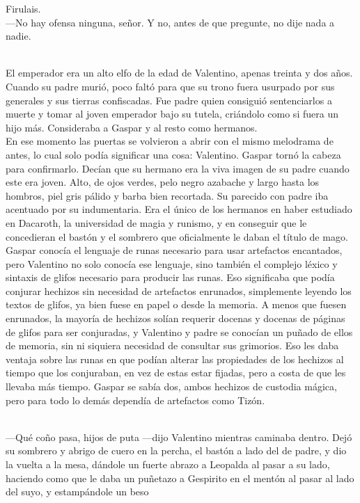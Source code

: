 \documentclass[
  letterpaper,
]{krantz}
\begin{document}
Firulais.\\
---No hay ofensa ninguna, señor. Y no, antes de que pregunte, no dije
nada a nadie.\\
\strut \\
El emperador era un alto elfo de la edad de Valentino, apenas treinta y
dos años. Cuando su padre murió, poco faltó para que su trono fuera
usurpado por sus generales y sus tierras confiscadas. Fue padre quien
consiguió sentenciarlos a muerte y tomar al joven emperador bajo su
tutela, criándolo como si fuera un hijo más. Consideraba a Gaspar y al
resto como hermanos.\\
En ese momento las puertas se volvieron a abrir con el mismo melodrama
de antes, lo cual solo podía significar una cosa: Valentino. Gaspar
tornó la cabeza para confirmarlo. Decían que su hermano era la viva
imagen de su padre cuando este era joven. Alto, de ojos verdes, pelo
negro azabache y largo hasta los hombros, piel gris pálido y barba bien
recortada. Su parecido con padre iba acentuado por su indumentaria. Era
el único de los hermanos en haber estudiado en Dacaroth, la universidad
de magia y runismo, y en conseguir que le concedieran el bastón y el
sombrero que oficialmente le daban el título de mago. Gaspar conocía el
lenguaje de runas necesario para usar artefactos encantados, pero
Valentino no solo conocía ese lenguaje, sino también el complejo léxico
y sintaxis de glifos necesario para producir las runas. Eso significaba
que podía conjurar hechizos sin necesidad de artefactos enrunados,
simplemente leyendo los textos de glifos, ya bien fuese en papel o desde
la memoria. A menos que fuesen enrunados, la mayoría de hechizos solían
requerir docenas y docenas de páginas de glifos para ser conjuradas, y
Valentino y padre se conocían un puñado de ellos de memoria, sin ni
siquiera necesidad de consultar sus grimorios. Eso les daba ventaja
sobre las runas en que podían alterar las propiedades de los hechizos al
tiempo que los conjuraban, en vez de estas estar fijadas, pero a costa
de que les llevaba más tiempo. Gaspar se sabía dos, ambos hechizos de
custodia mágica, pero para todo lo demás dependía de artefactos como
Tizón.\\
\strut \\
---Qué coño pasa, hijos de puta ---dijo Valentino mientras caminaba
dentro. Dejó su sombrero y abrigo de cuero en la percha, el bastón a
lado del de padre, y dio la vuelta a la mesa, dándole un fuerte abrazo a
Leopalda al pasar a su lado, haciendo como que le daba un puñetazo a
Gespirito en el mentón al pasar al lado del suyo, y estampándole un beso
\end{document}
